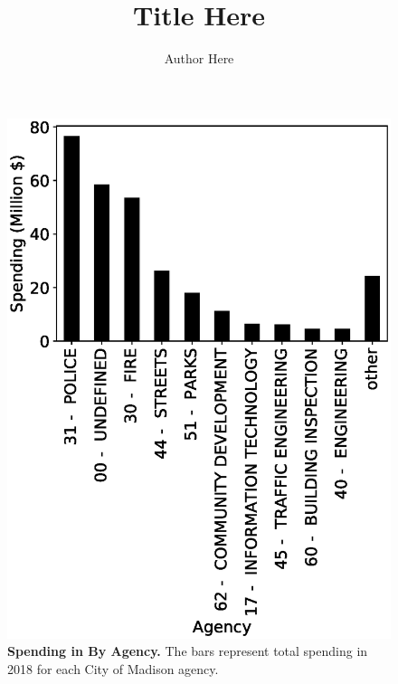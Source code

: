 \documentclass[12pt,twocolumn]{article}
\begin{document}
\title{Title Here}
\author{Author Here}
\date{}
\maketitle

\begin{figure}[t]
  \includegraphics[width=\columnwidth]{spend18.eps}
  \caption{{\bf Spending in By Agency.}  The bars represent total spending in 2018 for each City of Madison agency.}
\end{figure}
\end{document}
